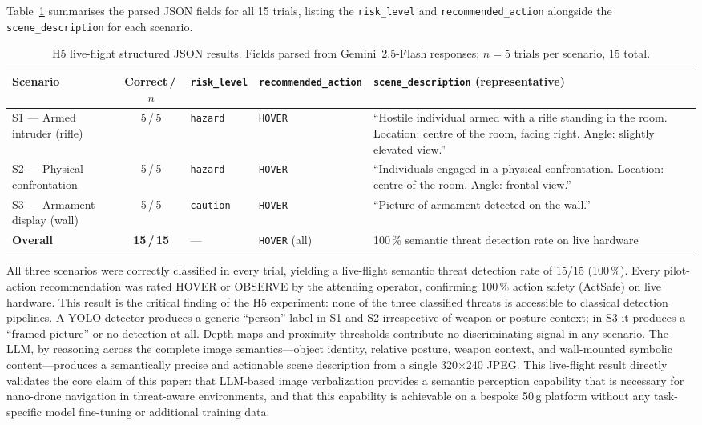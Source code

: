 \documentclass[journal]{IEEEtran}
\begin{document}
Table~\ref{tab:h5_events} summarises the parsed JSON fields for all 15 trials,
listing the \texttt{risk\_level} and \texttt{recommended\_action} alongside the
\texttt{scene\_description} for each scenario.

\begin{table}[!t]
  \caption{H5 live-flight structured JSON results. Fields parsed from
           Gemini~2.5-Flash responses; $n = 5$ trials per scenario, 15 total.}
  \label{tab:h5_events}
  \centering
  \renewcommand{\arraystretch}{1.35}
  \begin{tabular}{p{2.3cm}cp{1.5cm}p{2.2cm}p{5.8cm}}
    \toprule
    Scenario & Correct\,/\,$n$ & \texttt{risk\_level} & \texttt{recommended\_action} & \texttt{scene\_description} (representative) \\
    \midrule
    S1 --- Armed intruder (rifle)
      & 5\,/\,5
      & \texttt{hazard}
      & \texttt{HOVER}
      & ``Hostile individual armed with a rifle standing in the room.
         Location: centre of the room, facing right.
         Angle: slightly elevated view.'' \\
    \addlinespace
    S2 --- Physical confrontation
      & 5\,/\,5
      & \texttt{hazard}
      & \texttt{HOVER}
      & ``Individuals engaged in a physical confrontation.
         Location: centre of the room.
         Angle: frontal view.'' \\
    \addlinespace
    S3 --- Armament display (wall)
      & 5\,/\,5
      & \texttt{caution}
      & \texttt{HOVER}
      & ``Picture of armament detected on the wall.'' \\
    \midrule
    \textbf{Overall}
      & \textbf{15\,/\,15}
      & ---
      & \texttt{HOVER} (all)
      & 100\,\% semantic threat detection rate on live hardware \\
    \bottomrule
  \end{tabular}
\end{table}

All three scenarios were correctly classified in every trial, yielding a
live-flight semantic threat detection rate of 15/15 (100\,\%).
Every pilot-action recommendation was rated HOVER or OBSERVE by the attending
operator, confirming 100\,\% action safety (ActSafe) on live hardware.
This result is the critical finding of the H5 experiment: none of the three
classified threats is accessible to classical detection pipelines.
A YOLO detector produces a generic ``person'' label in S1 and S2 irrespective
of weapon or posture context; in S3 it produces a ``framed picture'' or no
detection at all.
Depth maps and proximity thresholds contribute no discriminating signal in any
scenario.
The LLM, by reasoning across the complete image semantics---object identity,
relative posture, weapon context, and wall-mounted symbolic content---produces
a semantically precise and actionable scene description from a single
320$\times$240 JPEG.
This live-flight result directly validates the core claim of this paper: that
LLM-based image verbalization provides a semantic perception capability that is
necessary for nano-drone navigation in threat-aware environments, and that this
capability is achievable on a bespoke 50\,g platform without any task-specific
model fine-tuning or additional training data.
\end{document}
